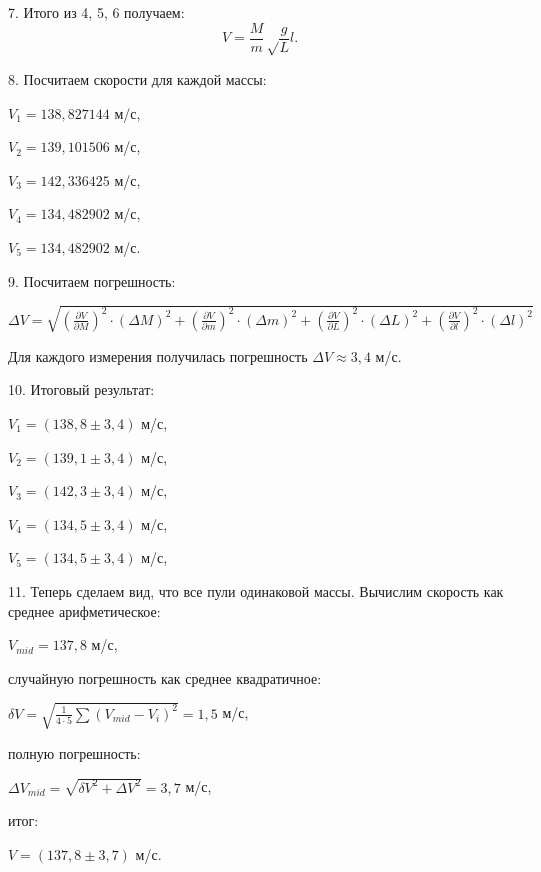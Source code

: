 7. Итого из 4, 5, 6 получаем:
\[V = \frac Mm\sqrt\frac gL l.\]

8. Посчитаем скорости для каждой массы:

\begin{center}

$V_1 = 138,827144$ м/с,

$V_2 = 139,101506$ м/с,

$V_3 = 142,336425$ м/с,

$V_4 = 134,482902$ м/с,

$V_5 = 134,482902$ м/с.

\end{center}

9. Посчитаем погрешность:

\begin{center}

$\Delta V = \sqrt{\left(\frac{\partial V}{\partial M}\right)^2\cdot \left(\Delta M\right)^2 + \left(\frac{\partial V}{\partial m}\right)^2\cdot \left(\Delta m\right)^2 + \left(\frac{\partial V}{\partial L}\right)^2\cdot \left(\Delta L\right)^2 + \left(\frac{\partial V}{\partial l}\right)^2\cdot \left(\Delta l\right)^2}$

\end{center}

Для каждого измерения получилась погрешность $\Delta V \approx 3,4$ м/с.

10. Итоговый результат:

\begin{center}

$V_1 = (138,8 \pm 3,4)$ м/с,

$V_2 = (139,1 \pm 3,4)$ м/с,

$V_3 = (142,3 \pm 3,4)$ м/с,

$V_4 = (134,5 \pm 3,4)$ м/с,

$V_5 = (134,5 \pm 3,4)$ м/с,

\end{center}

11. Теперь сделаем вид, что все пули одинаковой массы. Вычислим скорость как среднее арифметическое:

\begin{center}

$V_{mid} = 137, 8$ м/с,

\end{center}
случайную погрешность как среднее квадратичное:
\begin{center}

$\delta V = \sqrt{\frac{1}{4\cdot5}\sum\left(V_{mid} - V_i\right)^2} = 1,5$ м/с,

\end{center}
полную погрешность:
\begin{center}

$\Delta V_{mid} = \sqrt{\delta V^2 + \Delta V^2} = 3,7$ м/с,

\end{center}
итог:
\begin{center}

$V = (137,8 \pm 3,7)$ м/с.

\end{center}

